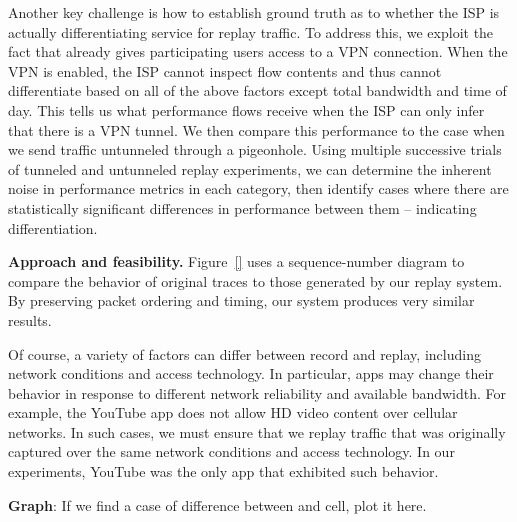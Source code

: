 Another key challenge is how to establish ground truth as to whether the ISP is 
actually differentiating service for replay traffic. To address this, we exploit the fact 
that \meddle already gives participating users access to a VPN connection. When the 
VPN is enabled, the ISP cannot inspect flow contents and thus cannot differentiate based 
on all of the above factors except total bandwidth and time of day. This tells us what 
performance flows receive when the ISP can only infer that there is a VPN tunnel. 
We then compare this performance to the case when we send traffic untunneled through a 
pigeonhole. Using multiple successive trials of tunneled and untunneled replay experiments, 
we can determine the inherent noise in performance metrics in each category, then 
identify cases where there are statistically significant differences in performance between 
them -- indicating differentiation. 





\noindent\textbf{Approach and feasibility.}
Figure~\ref{} uses a sequence-number diagram to compare the behavior of original traces 
to those generated by our replay system. By preserving packet ordering and timing, our 
system produces very similar results. 

Of course, a variety of factors can differ between record and replay, including network 
conditions and access technology. In particular, apps may change their behavior in response 
to different network reliability and available bandwidth. For example, the YouTube app does not 
allow HD video content over cellular networks. In such cases, we must ensure that we replay 
traffic that was originally captured over the same network conditions and access technology. 
In our experiments, YouTube was the only app that exhibited such behavior.


\textbf{Graph}: If we find a case of difference between \wifi and cell, plot it here.


